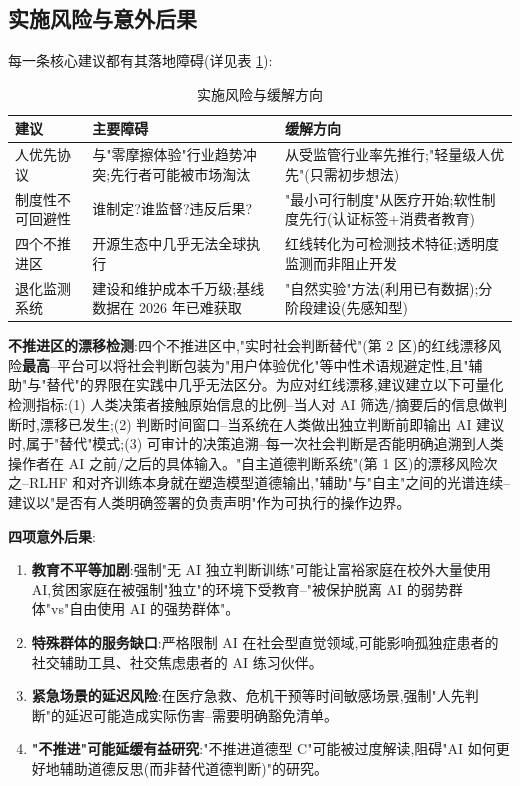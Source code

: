 \documentclass[11pt,a4paper]{article}
\begin{document}
\subsection{实施风险与意外后果}

每一条核心建议都有其落地障碍(详见表 \ref{tab:risks}):

\begin{table}[htbp]
  \centering
  \caption{实施风险与缓解方向}
  \label{tab:risks}
  \begin{tabular}{p{3.5cm}p{4.5cm}p{4.5cm}}
    \toprule
    \textbf{建议} & \textbf{主要障碍} & \textbf{缓解方向} \\
    \midrule
    人优先协议 & 与"零摩擦体验"行业趋势冲突;先行者可能被市场淘汰 & 从受监管行业率先推行;"轻量级人优先"(只需初步想法) \\
    \hline
    制度性不可回避性 & 谁制定?谁监督?违反后果?& "最小可行制度"从医疗开始;软性制度先行(认证标签+消费者教育) \\
    \hline
    四个不推进区 & 开源生态中几乎无法全球执行 & 红线转化为可检测技术特征;透明度监测而非阻止开发 \\
    \hline
    退化监测系统 & 建设和维护成本千万级;基线数据在 2026 年已难获取 & "自然实验"方法(利用已有数据);分阶段建设(先感知型) \\
    \bottomrule
  \end{tabular}
\end{table}

\textbf{不推进区的漂移检测}:四个不推进区中,"实时社会判断替代"(第 2 区)的红线漂移风险\textbf{最高}--平台可以将社会判断包装为"用户体验优化"等中性术语规避定性,且"辅助"与"替代"的界限在实践中几乎无法区分。为应对红线漂移,建议建立以下可量化检测指标:(1) 人类决策者接触原始信息的比例--当人对 AI 筛选/摘要后的信息做判断时,漂移已发生;(2) 判断时间窗口--当系统在人类做出独立判断前即输出 AI 建议时,属于"替代"模式;(3) 可审计的决策追溯--每一次社会判断是否能明确追溯到人类操作者在 AI 之前/之后的具体输入。"自主道德判断系统"(第 1 区)的漂移风险次之--RLHF 和对齐训练本身就在塑造模型道德输出,"辅助"与"自主"之间的光谱连续--建议以"是否有人类明确签署的负责声明"作为可执行的操作边界。

\textbf{四项意外后果}:

\begin{enumerate}[label=(\arabic*)]
  \item \textbf{教育不平等加剧}:强制"无 AI 独立判断训练"可能让富裕家庭在校外大量使用 AI,贫困家庭在被强制"独立"的环境下受教育--"被保护脱离 AI 的弱势群体"vs"自由使用 AI 的强势群体"。
  \item \textbf{特殊群体的服务缺口}:严格限制 AI 在社会型直觉领域,可能影响孤独症患者的社交辅助工具、社交焦虑患者的 AI 练习伙伴。
  \item \textbf{紧急场景的延迟风险}:在医疗急救、危机干预等时间敏感场景,强制"人先判断"的延迟可能造成实际伤害--需要明确豁免清单。
  \item \textbf{"不推进"可能延缓有益研究}:"不推进道德型 C"可能被过度解读,阻碍"AI 如何更好地辅助道德反思(而非替代道德判断)"的研究。
\end{enumerate}
\end{document}

